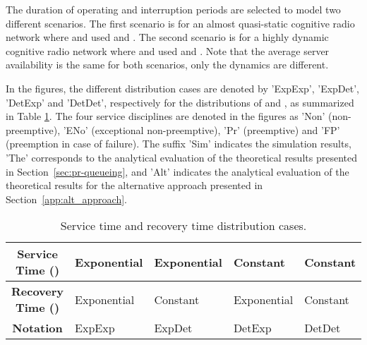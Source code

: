\documentclass[11pt,journal,oneside,onecolumn,draftclsnofoot]{IEEEtran}
\begin{document}
The duration of operating and interruption periods are selected to model two different scenarios. The first scenario is for an almost quasi-static cognitive radio network where  and used  and .
The second scenario is for a highly dynamic cognitive radio network \cite{khalife09} where  and used  and . Note that the average server availability is the same for both scenarios, only the dynamics are different.

In the figures, the different distribution cases are denoted by 'ExpExp', 'ExpDet', 'DetExp' and 'DetDet', respectively for the distributions of  and , as summarized in Table \ref{tab:notations2}. The four service disciplines are denoted in the figures as 'Non' (non-preemptive), 'ENo' (exceptional non-preemptive), 'Pr' (preemptive) and 'FP' (preemption in case of failure). The suffix 'Sim' indicates the simulation results, 'The' corresponds to the analytical evaluation of the theoretical results presented in Section~\ref{sec:pr-queueing}, and 'Alt' indicates the analytical evaluation of the theoretical results for the alternative approach presented in Section~\ref{app:alt_approach}.

 \scriptsize
\begin{table}[]
\renewcommand{\arraystretch}{1.3}
\caption{{Service time and recovery time distribution cases.}}
 \label{tab:notations2}
\begin{tabular} {|c|l|l|l|l|}
 \hline
 \hline
\textbf{Service Time ()}&Exponential& Exponential&Constant&Constant\\
 \hline
\textbf{Recovery Time ()}&Exponential& Constant&Exponential&Constant\\
 \hline
\textbf{Notation}&ExpExp& ExpDet&DetExp&DetDet\\
 \hline
\end{tabular}
\normalsize
\end{table}
\normalsize
\end{document}
